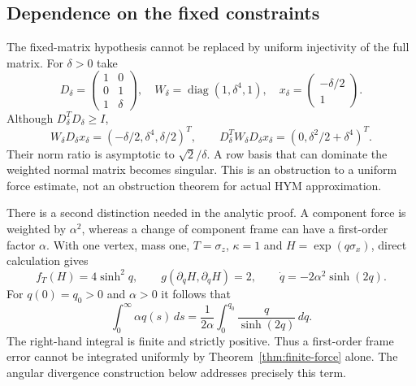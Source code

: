 \subsection{Dependence on the fixed constraints}
The fixed-matrix hypothesis cannot be replaced by uniform injectivity
of the full matrix. For $\delta>0$ take
\[
 D_\delta=\begin{pmatrix}1&0\\0&1\\1&\delta\end{pmatrix},
 \quad W_\delta=\operatorname{diag}(1,\delta^4,1),
 \quad x_\delta=\begin{pmatrix}-\delta/2\\1\end{pmatrix}.
\]
Although $D_\delta^TD_\delta\ge I$,
\[
 W_\delta D_\delta x_\delta
 =(-\delta/2,\delta^4,\delta/2)^T,
 \qquad D_\delta^TW_\delta D_\delta x_\delta
 =(0,\delta^2/2+\delta^4)^T.
\]
Their norm ratio is asymptotic to $\sqrt2/\delta$.
A row basis that can dominate the weighted normal matrix becomes
singular. This is an obstruction to a uniform force estimate, not
an obstruction theorem for actual HYM approximation.

There is a second distinction needed in the analytic proof. A
component force is weighted by $\alpha^2$, whereas a change of
component frame can have a first-order factor $\alpha$. With one
vertex, mass one, $T=\sigma_z$, $\kappa=1$ and
$H=\exp(q\sigma_x)$, direct calculation gives
\[
 f_T(H)=4\sinh^2q,\qquad
 g(\partial_qH,\partial_qH)=2,\qquad
 \dot q=-2\alpha^2\sinh(2q).
\]
For $q(0)=q_0>0$ and $\alpha>0$ it follows that
\begin{equation}\label{eq:first-order-divergence}
 \int_0^\infty\alpha q(s)\,ds
   =\frac1{2\alpha}\int_0^{q_0}\frac{q}{\sinh(2q)}\,dq.
\end{equation}
The right-hand integral is finite and strictly positive. Thus a
first-order frame error cannot be integrated uniformly by
Theorem~\ref{thm:finite-force} alone. The angular divergence
construction below addresses precisely this term.
